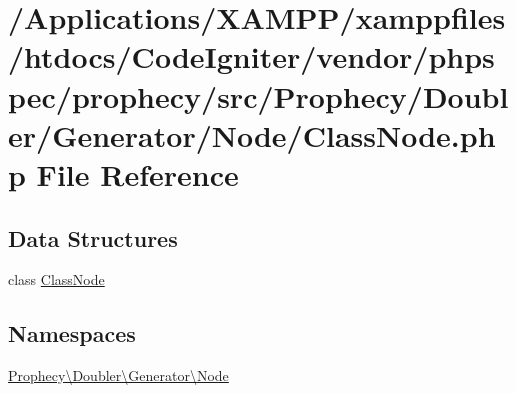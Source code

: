 \hypertarget{_class_node_8php}{}\section{/\+Applications/\+X\+A\+M\+P\+P/xamppfiles/htdocs/\+Code\+Igniter/vendor/phpspec/prophecy/src/\+Prophecy/\+Doubler/\+Generator/\+Node/\+Class\+Node.php File Reference}
\label{_class_node_8php}
\subsection*{Data Structures}
\begin{DoxyCompactItemize}
\item 
class \mbox{\hyperlink{class_prophecy_1_1_doubler_1_1_generator_1_1_node_1_1_class_node}{Class\+Node}}
\end{DoxyCompactItemize}
\subsection*{Namespaces}
\begin{DoxyCompactItemize}
\item 
 \mbox{\hyperlink{namespace_prophecy_1_1_doubler_1_1_generator_1_1_node}{Prophecy\textbackslash{}\+Doubler\textbackslash{}\+Generator\textbackslash{}\+Node}}
\end{DoxyCompactItemize}

